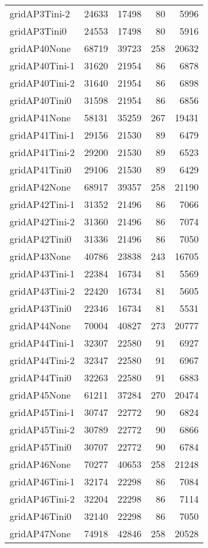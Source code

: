 \begin{longtable}{lrrrr}
gridAP3Tini-2 & 24633 & 17498 & 80 & 5996 \\
gridAP3Tini0 & 24553 & 17498 & 80 & 5916 \\
gridAP40None & 68719 & 39723 & 258 & 20632 \\
gridAP40Tini-1 & 31620 & 21954 & 86 & 6878 \\
gridAP40Tini-2 & 31640 & 21954 & 86 & 6898 \\
gridAP40Tini0 & 31598 & 21954 & 86 & 6856 \\
gridAP41None & 58131 & 35259 & 267 & 19431 \\
gridAP41Tini-1 & 29156 & 21530 & 89 & 6479 \\
gridAP41Tini-2 & 29200 & 21530 & 89 & 6523 \\
gridAP41Tini0 & 29106 & 21530 & 89 & 6429 \\
gridAP42None & 68917 & 39357 & 258 & 21190 \\
gridAP42Tini-1 & 31352 & 21496 & 86 & 7066 \\
gridAP42Tini-2 & 31360 & 21496 & 86 & 7074 \\
gridAP42Tini0 & 31336 & 21496 & 86 & 7050 \\
gridAP43None & 40786 & 23838 & 243 & 16705 \\
gridAP43Tini-1 & 22384 & 16734 & 81 & 5569 \\
gridAP43Tini-2 & 22420 & 16734 & 81 & 5605 \\
gridAP43Tini0 & 22346 & 16734 & 81 & 5531 \\
gridAP44None & 70004 & 40827 & 273 & 20777 \\
gridAP44Tini-1 & 32307 & 22580 & 91 & 6927 \\
gridAP44Tini-2 & 32347 & 22580 & 91 & 6967 \\
gridAP44Tini0 & 32263 & 22580 & 91 & 6883 \\
gridAP45None & 61211 & 37284 & 270 & 20474 \\
gridAP45Tini-1 & 30747 & 22772 & 90 & 6824 \\
gridAP45Tini-2 & 30789 & 22772 & 90 & 6866 \\
gridAP45Tini0 & 30707 & 22772 & 90 & 6784 \\
gridAP46None & 70277 & 40653 & 258 & 21248 \\
gridAP46Tini-1 & 32174 & 22298 & 86 & 7084 \\
gridAP46Tini-2 & 32204 & 22298 & 86 & 7114 \\
gridAP46Tini0 & 32140 & 22298 & 86 & 7050 \\
gridAP47None & 74918 & 42846 & 258 & 20528 \\

\end{longtable}
